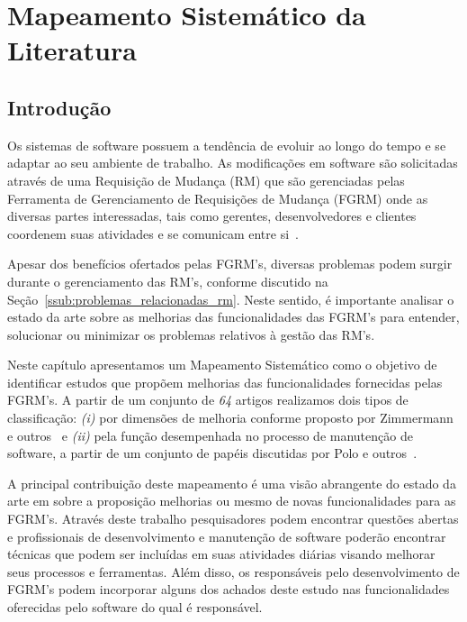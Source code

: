 
\chapter{Mapeamento Sistemático da Literatura}
\label{ch:mapeamento-sistematico}

\section{Introdução}
\label{sec:map-intro}

Os sistemas de software possuem a tendência de evoluir ao longo do tempo e se
adaptar ao seu ambiente de trabalho. As modificações em software são solicitadas
através de uma Requisição de Mudança (RM) que são gerenciadas pelas Ferramenta
de Ge\-ren\-ci\-a\-men\-to de Requisições de Mudança (FGRM) onde as diversas
partes interessadas, tais como gerentes, desenvolvedores e clientes coordenem
suas atividades e se comunicam entre si~\cite{bertram2010communication}.

Apesar dos benefícios ofertados pelas FGRM's, diversas problemas podem surgir
durante o gerenciamento das RM's, conforme discutido na
Seção~\ref{ssub:problemas_relacionadas_rm}. Neste sentido, é importante analisar
o estado da arte sobre as melhorias das fun\-ci\-o\-na\-li\-da\-des das FGRM's
para entender, solucionar ou minimizar os problemas relativos à gestão das RM's.

Neste capítulo apresentamos um Mapeamento Sistemático como o objetivo de
identificar estudos que propõem melhorias das funcionalidades fornecidas pelas
FGRM's. A partir de um conjunto de \textit{64} artigos realizamos dois tipos de
classificação: \textit{(i)} por dimensões de melhoria conforme proposto
por Zimmermann e outros~\cite{zimmermann2009improving} e \textit{(ii)} pela
função desempenhada no processo de manutenção de software, a partir de um
conjunto de papéis discutidas por Polo e outros~\cite{Polo1999}.

A principal contribuição deste mapeamento é uma visão abrangente do estado da
arte em sobre a proposição melhorias ou mesmo de novas funcionalidades para as
FGRM's. Através deste trabalho pesquisadores podem encontrar questões abertas e
profissionais de desenvolvimento e manutenção de software poderão encontrar
técnicas que podem ser incluídas em suas atividades diárias visando melhorar
seus processos e ferramentas. Além disso, os responsáveis pelo desenvolvimento
de FGRM's podem incorporar alguns dos achados deste estudo nas funcionalidades
oferecidas pelo software do qual é responsável.

